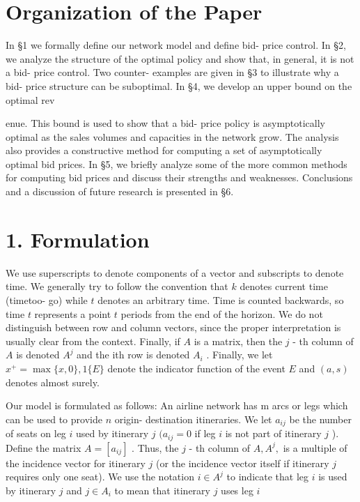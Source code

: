 \section{Organization of the Paper}\label{organization-of-the-paper}

In §1 we formally define our network model and define bid- price
control. In §2, we analyze the structure of the optimal policy and show
that, in general, it is not a bid- price control. Two counter- examples
are given in §3 to illustrate why a bid- price structure can be
suboptimal. In §4, we develop an upper bound on the optimal rev

enue. This bound is used to show that a bid- price policy is
asymptotically optimal as the sales volumes and capacities in the
network grow. The analysis also provides a constructive method for
computing a set of asymptotically optimal bid prices. In §5, we briefly
analyze some of the more common methods for computing bid prices and
discuss their strengths and weaknesses. Conclusions and a discussion of
future research is presented in §6.

\section{1. Formulation}\label{formulation}

We use superscripts to denote components of a vector and subscripts to
denote time. We generally try to follow the convention that \(k\)
denotes current time (timetoo- go) while \(t\) denotes an arbitrary
time. Time is counted backwards, so time \(t\) represents a point \(t\)
periods from the end of the horizon. We do not distinguish between row
and column vectors, since the proper interpretation is usually clear
from the context. Finally, if \(A\) is a matrix, then the \(j\) - th
column of \(A\) is denoted \(A^{j}\) and the ith row is denoted
\(A_{i}\) . Finally, we let \(x^{+} = \max \{x,0\} ,1\{E\}\) denote the
indicator function of the event \(E\) and \((a,s)\) denotes almost
surely.

Our model is formulated as follows: An airline network has m arcs or
legs which can be used to provide \(n\) origin- destination itineraries.
We let \(a_{ij}\) be the number of seats on leg \(i\) used by itinerary
\(j\) \((a_{ij} = 0\) if leg \(i\) is not part of itinerary \(j\) ).
Define the matrix \(A = [a_{ij}]\) . Thus, the \(j\) - th column of
\(A,A^{j},\) is a multiple of the incidence vector for itinerary \(j\)
(or the incidence vector itself if itinerary \(j\) requires only one
seat). We use the notation \(i\in A^{j}\) to indicate that leg \(i\) is
used by itinerary \(j\) and \(j\in A_{i}\) to mean that itinerary \(j\)
uses leg \(i\)

